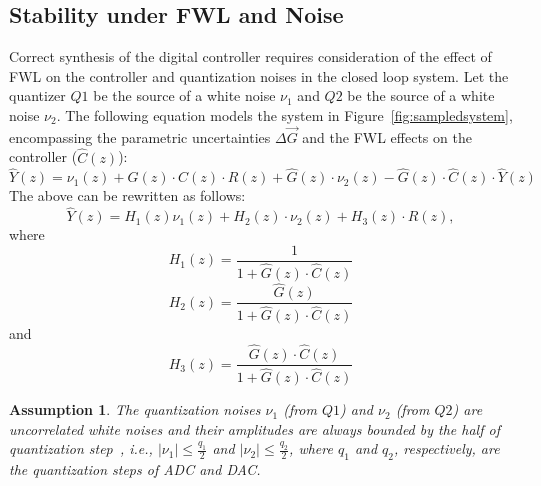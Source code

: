\documentclass[final]{sig-alternate-05-2015}
\newtheorem{myassumption}{Assumption}
\begin{document}
\subsection{Stability under FWL and Noise}
\label{sec:stability}

Correct synthesis of the digital controller requires consideration of the
effect of FWL on the controller and quantization noises in the closed loop
system.  Let the quantizer $Q1$ be the source of a white noise $\nu_{1}$ and
$Q2$ be the source of a white noise $\nu_{2}$.  The following equation
models the system in Figure~\ref{fig:sampledsystem}, encompassing the
parametric uncertainties $\Delta \vec{G}$ and the FWL effects on
the controller ($\hat{C}(z)$):
%
\begin{equation}
\hat{Y}(z)=\nu_{1}(z)+\hat{G}(z)\cdot C(z)\cdot R(z)+\hat{G}(z)\cdot\nu_{2}(z)-\hat{G}(z)\cdot \hat{C}(z)\cdot \hat{Y}(z)
\end{equation}
%
%
%
%
The above can be rewritten as follows:
%
\begin{equation}
\label{eq:outputfunctions}
\hat{Y}(z)=H_{1}(z)\nu_{1}(z)+H_{2}(z)\cdot\nu_{2}(z)+H_{3}(z)\cdot R(z),
\end{equation}
%
where
%
\begin{equation}
H_{1}(z)=\frac{1}{1+\hat{G}(z)\cdot \hat{C}(z)}
\end{equation}
%
\begin{equation}
H_{2}(z)=\frac{\hat{G}(z)}{1+\hat{G}(z)\cdot \hat{C}(z)}
\end{equation}
%
and
%
\begin{equation}
H_{3}(z)=\frac{\hat{G}(z)\cdot \hat{C}(z)}{1+\hat{G}(z)\cdot \hat{C}(z)}
\end{equation}

\begin{myassumption}
\label{whitenoise}
%
The quantization noises $\nu_{1}$ (from $Q1$) and $\nu_{2}$ (from $Q2$) are
uncorrelated white noises and their amplitudes are always bounded by the
half of quantization step~\cite{astrom1997computer}, i.e., $\vert \nu_{1}
\vert \leq \frac{q_{1}}{2}$ and $\vert \nu_{2} \vert \leq \frac{q_{2}}{2}$,
where $q_{1}$ and $q_{2}$, respectively, are the quantization steps of ADC
and DAC.
% 
\end{myassumption}
\end{document}
